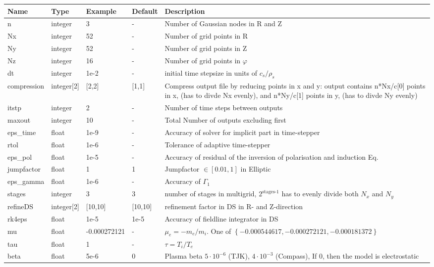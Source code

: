 \begin{longtable}{llll>{\RaggedRight}p{6cm}}
\toprule
\rowcolor{gray!50}\textbf{Name} &  \textbf{Type} & \textbf{Example} & \textbf{Default} & \textbf{Description}  \\ \midrule
n      & integer & 3 & - &Number of Gaussian nodes in R and Z \\
Nx     & integer &52& - &Number of grid points in R \\
Ny     & integer &52& - &Number of grid points in Z \\
Nz     & integer &16& - &Number of grid points in $\varphi$ \\
dt     & integer &1e-2& - &initial time stepsize in units of $c_s/\rho_s$ \\
compression & integer[2] & [2,2] & [1,1] & Compress output file by reducing points in x and y: output contains n*Nx/c[0] points in x,
    (has to divde Nx evenly), and n*Ny/c[1] points in y,
    (has to divde Ny evenly)\\
itstp       & integer & 2  & - & Number of time steps between outputs \\
maxout      & integer & 10 & - & Total Number of outputs excluding first \\
eps\_time   & float & 1e-9  & - & Accuracy of solver for implicit part in time-stepper \\
rtol  & float &1e-6   & - &Tolerance of adaptive time-stepper \\
eps\_pol    & float & 1e-5  & - &  Accuracy of residual of the inversion of polarisation and induction Eq. \\
jumpfactor  & float & 1 & 1 & Jumpfactor $\in \left[0.01,1\right]$ in Elliptic\\
eps\_gamma  & float & 1e-6  & - & Accuracy of $\Gamma_1$  \\
stages      & integer & 3 & 3 & number of stages in multigrid, $2^{\text{stages-1}}$
has to evenly divide both $N_x$ and $N_y$\\
refineDS     & integer[2] & [10,10] & [10,10] & refinement factor in DS in R- and Z-direction\\
rk4eps     & float & 1e-5 & 1e-5 & Accuracy of fieldline integrator in DS\\
mu         & float & -0.000272121& - & $\mu_e =-m_e/m_i$.
    One of $\left\{ -0.000544617, -0.000272121, -0.000181372 \right\}$\\
tau        & float &1      & - & $\tau = T_i/T_e$  \\
beta       & float & 5e-6  & 0 & Plasma beta $5\cdot 10^{-6}$ (TJK), $4\cdot 10^{-3}$ (Compass), If $0$, then the model is electrostatic \\

\end{longtable}
